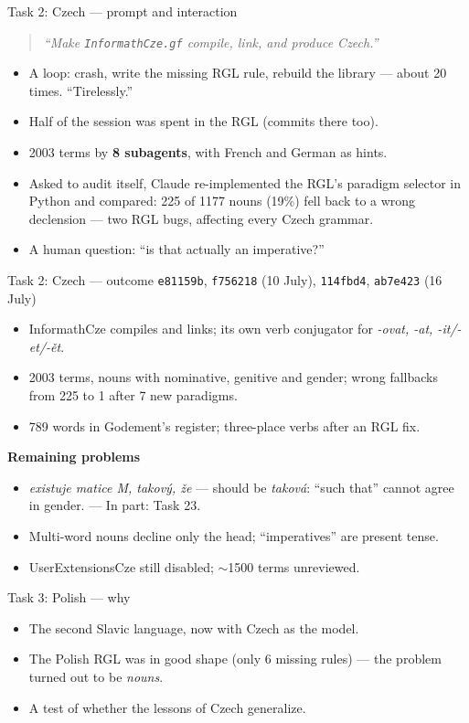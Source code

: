 \documentclass[10pt,aspectratio=169]{beamer}
\newcommand{\bad}[1]{\textcolor{warn}{#1}}
\newcommand{\ok}[1]{\textcolor{good}{#1}}
\newcommand{\commit}[1]{\texttt{\footnotesize #1}}
\newcommand{\prompt}[1]{\begin{quote}\small\itshape ``#1''\end{quote}}
\begin{document}
\begin{frame}{Task 2: Czech --- prompt and interaction}
  \prompt{Make \texttt{InformathCze.gf} compile, link, and produce Czech.}
  \begin{itemize}
    \item A loop: crash, write the missing RGL rule, rebuild the library ---
          about 20 times. ``Tirelessly.''
    \item Half of the session was spent in the RGL (commits there too).
    \item 2003 terms by \textbf{8 subagents}, with French and German as hints.
    \item Asked to audit itself, Claude re-implemented the RGL's paradigm
          selector in Python and compared: \bad{225 of 1177 nouns (19\%)}
          fell back to a wrong declension --- two RGL bugs, affecting every Czech grammar.
    \item A human question: ``is that actually an imperative?''
  \end{itemize}
\end{frame}

\begin{frame}{Task 2: Czech --- outcome}
  \commit{e81159b}, \commit{f756218} (10 July), \commit{114fbd4}, \commit{ab7e423} (16 July)
  \begin{itemize}\small
    \item InformathCze compiles and links; its own verb conjugator for
          \emph{-ovat, -at, -it/-et/-ět}.
    \item 2003 terms, nouns with nominative, genitive and gender; wrong
          fallbacks from 225 to 1 after 7 new paradigms.
    \item 789 words in Godement's register; three-place verbs after an RGL fix.
  \end{itemize}
  \textbf{Remaining problems}
  \begin{itemize}\small
    \item \bad{\emph{existuje matice M, takový, že}} --- should be \emph{taková}:
          ``such that'' cannot agree in gender. \ok{--- In part: Task 23.}
    \item Multi-word nouns decline only the head; ``imperatives'' are present tense.
    \item UserExtensionsCze still disabled; $\sim$1500 terms unreviewed.
  \end{itemize}
\end{frame}

\begin{frame}{Task 3: Polish --- why}
  \begin{itemize}
    \item The second Slavic language, now with Czech as the model.
    \item The Polish RGL was in good shape (only 6 missing rules) ---
          the problem turned out to be \emph{nouns}.
    \item A test of whether the lessons of Czech generalize.
  \end{itemize}
\end{frame}
\end{document}
